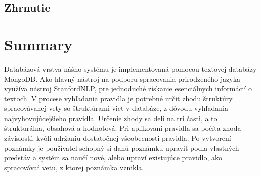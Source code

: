 %
%

%
%
{
	\subsection{Zhrnutie}
}
{
	\section{Summary}
}
\label{subsection:system_summary}
Databázová vrstva nášho systému je implementovaná pomocou textovej databázy MongoDB. Ako hlavný nástroj na podporu spracovania prirodzeného jazyka využíva nástroj StanfordNLP, pre jednoduché získanie esenciálnych informácií o textoch. V procese vyhľadania pravidla je potrebné určiť zhodu štruktúry spracovávanej vety so štruktúrami viet v databáze, z dôvodu vyhľadania najvyhovujúcejšieho pravidla. Určenie zhody sa delí na tri časti, a to štrukturálna, obsahová a hodnotová. Pri aplikovaní pravidla sa počíta zhoda závislostí, kvôli udržaniu dostatočnej všeobecnosti pravidla. Po vytvorení poznámky je používateľ schopný si danú poznámku upraviť podľa vlastných predstáv a systém sa naučí nové, alebo upraví existujúce pravidlo, ako spracovávať vetu, z ktorej poznámka vznikla.